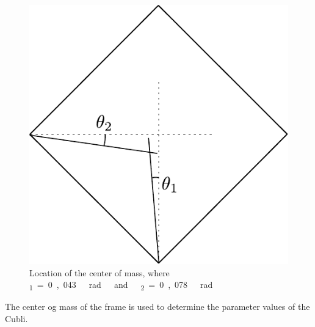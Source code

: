 \begin{figure}[H]
	\centering
	\includegraphics[scale=0.5]{figures/centerOfMassDiagram}
	\caption{Location of the center of mass, where \si{\theta_1=0,043\ rad\ and\ \theta_2=0,078\ rad}}
	\label{centerOfMassDiagram2}
\end{figure}

The center og mass of the frame is used to determine the parameter values of the Cubli.

